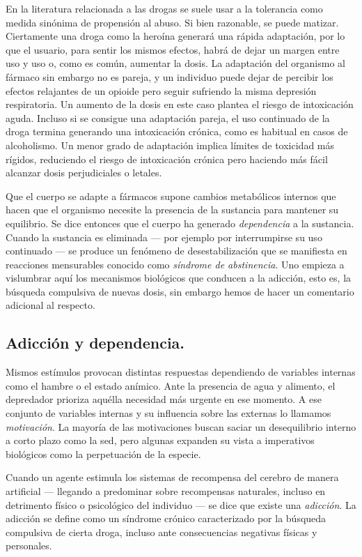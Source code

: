 En la literatura relacionada a las drogas se suele usar a la tolerancia como medida sinónima de propensión al abuso. Si bien razonable, se puede matizar. Ciertamente una droga como la heroína generará una rápida adaptación, por lo que el usuario, para sentir los mismos efectos, habrá de dejar un margen entre uso y uso o, como es común, aumentar la dosis. La adaptación del organismo al fármaco sin embargo no es pareja, y un individuo puede dejar de percibir los efectos relajantes de un opioide pero seguir sufriendo la misma depresión respiratoria. Un aumento de la dosis en este caso plantea el riesgo de intoxicación aguda. Incluso si se consigue una adaptación pareja, el uso continuado de la droga termina generando una intoxicación crónica, como es habitual en casos de alcoholismo. Un menor grado de adaptación implica límites de toxicidad más rígidos, reduciendo el riesgo de intoxicación crónica pero haciendo más fácil alcanzar dosis perjudiciales o letales.

Que el cuerpo se adapte a fármacos supone cambios metabólicos internos que hacen que el organismo necesite la presencia de la sustancia para mantener su equilibrio. Se dice entonces que el cuerpo ha generado \textit{dependencia} a la sustancia. Cuando la sustancia es eliminada --- por ejemplo por interrumpirse su uso continuado --- se produce un fenómeno de desestabilización que se manifiesta en reacciones mensurables conocido como \textit{síndrome de abstinencia}. Uno empieza a vislumbrar aquí los mecanismos biológicos que conducen a la adicción, esto es, la búsqueda compulsiva de nuevas dosis, sin embargo hemos de hacer un comentario adicional al respecto.

\newpage

\subsection{Adicción y dependencia.}

Mismos estímulos provocan distintas respuestas dependiendo de variables internas como el hambre o el estado anímico. Ante la presencia de agua y alimento, el depredador prioriza aquélla necesidad más urgente en ese momento. A ese conjunto de variables internas y su influencia sobre las externas lo llamamos \textit{motivación}. La mayoría de las motivaciones buscan saciar un desequilibrio interno a corto plazo como la sed, pero algunas expanden su vista a imperativos biológicos como la perpetuación de la especie.

Cuando un agente estimula los sistemas de recompensa del cerebro de manera artificial --- llegando a predominar sobre recompensas naturales, incluso en detrimento físico o psicológico del individuo --- se dice que existe una \textit{adicción}. La adicción se define como un síndrome crónico caracterizado por la búsqueda compulsiva de cierta droga, incluso ante consecuencias negativas físicas y personales.

